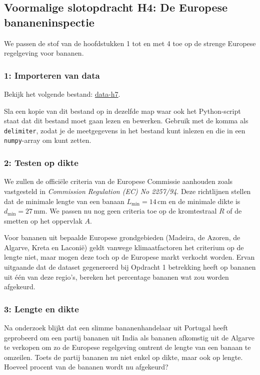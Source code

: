 \documentclass[a4paper,11pt, fleqn]{article}
\begin{document}
\subsection{Voormalige slotopdracht H4: De Europese bananeninspectie}
We passen de stof van de hoofdstukken 1 tot en met 4 toe op de strenge Europese regelgeving voor bananen.

\subsubsection*{1: Importeren van data}
Bekijk het volgende bestand: 
\href{https://github.com/Ichthus-College-IN/Python-x-Meet-je-leefomgeving/tree/main/inc/data_h7.txt}{data-h7}.

Sla een kopie van dit bestand op in dezelfde map waar ook het Python-script staat dat dit bestand moet gaan lezen en bewerken.
Gebruik  met de komma als \verb,delimiter,, zodat je de meetgegevens in het bestand kunt inlezen en die in een \verb,numpy,-array om kunt zetten.

\subsubsection*{2: Testen op dikte}
We zullen de offici\"ele criteria van de Europese Commissie aanhouden zoals vastgesteld in \emph{Commission Regulation (EC) No 2257/94}. Deze richtlijnen stellen dat de minimale lengte van een banaan $L_\textrm{min} = 14\,\textrm{cm}$ en de minimale dikte is $d_\textrm{min} = 27\,\textrm{mm}$. We passen nu nog geen criteria toe op de kromtestraal $R$ of de smetten op het oppervlak $A$.

Voor bananen uit bepaalde Europese grondgebieden (Madeira, de Azoren, de Algarve, Kreta en Laconi\"e) geldt vanwege klimaatfactoren het criterium op de lengte niet, maar mogen deze toch op de Europese markt verkocht worden. Ervan uitgaande dat de dataset gegenereerd bij Opdracht 1 betrekking heeft op bananen uit \'e\'en van deze regio's, bereken het percentage bananen wat zou worden afgekeurd.

\subsubsection*{3: Lengte en dikte}
Na onderzoek blijkt dat een slimme bananenhandelaar uit Portugal heeft geprobeerd om een partij bananen uit India als bananen afkomstig uit de Algarve te verkopen om zo de Europese regelgeving omtrent de lengte van een banaan te omzeilen. Toets de partij bananen nu niet enkel op dikte, maar ook op lengte. Hoeveel procent van de bananen wordt nu afgekeurd?
\end{document}
